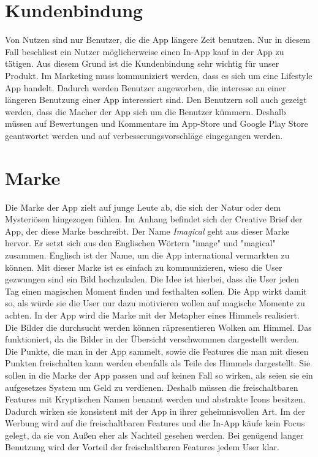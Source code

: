 \section{Kundenbindung}

Von Nutzen sind nur Benutzer, die die App längere Zeit benutzen. Nur in diesem Fall beschliest ein Nutzer möglicherweise einen In-App kauf in der App zu tätigen. Aus diesem Grund ist die Kundenbindung sehr wichtig für unser Produkt. Im Marketing muss kommuniziert werden, dass es sich um eine Lifestyle App handelt. Dadurch werden Benutzer angeworben, die interesse an einer längeren Benutzung einer App interessiert sind.
Den Benutzern soll auch gezeigt werden, dass die Macher der App sich um die Benutzer kümmern. Deshalb müssen auf Bewertungen und Kommentare im App-Store und Google Play Store geantwortet werden und auf verbesserungsvorschläge eingegangen werden.

\section{Marke}

Die Marke der App zielt auf junge Leute ab, die sich der Natur oder dem Mysteriösen hingezogen fühlen. Im Anhang befindet sich der Creative Brief der App, der diese Marke beschreibt.
Der Name \textit{Imagical} geht aus dieser Marke hervor. Er setzt sich aus den Englischen Wörtern "image" und "magical" zusammen. Englisch ist der Name, um die App international vermarkten zu können.
Mit dieser Marke ist es einfach zu kommunizieren, wieso die User gezwungen sind ein Bild hochzuladen. Die Idee ist hierbei, dass die User jeden Tag einen magischen Moment finden und festhalten sollen. Die App wirkt damit so, als würde sie die User nur dazu motivieren wollen auf magische Momente zu achten.
In der App wird die Marke mit der Metapher eines Himmels realisiert. Die Bilder die durchsucht werden können räpresentieren Wolken am Himmel. Das funktioniert, da die Bilder in der Übersicht verschwommen dargestellt werden. Die Punkte, die man in der App sammelt, sowie die Features die man mit diesen Punkten freischalten kann werden ebenfalls als Teile des Himmels dargestellt. Sie sollen in die Marke der App passen und auf keinen Fall so wirken, als seien sie ein aufgesetzes System um Geld zu verdienen. Deshalb müssen die freischaltbaren Features mit Kryptischen Namen benannt werden und abstrakte Icons besitzen. Dadurch wirken sie konsistent mit der App in ihrer geheimnisvollen Art.
Im der Werbung wird auf die freischaltbaren Features und die In-App käufe kein Focus gelegt, da sie von Außen eher als Nachteil gesehen werden. Bei genügend langer Benutzung wird der Vorteil der freischaltbaren Features jedem User klar.

